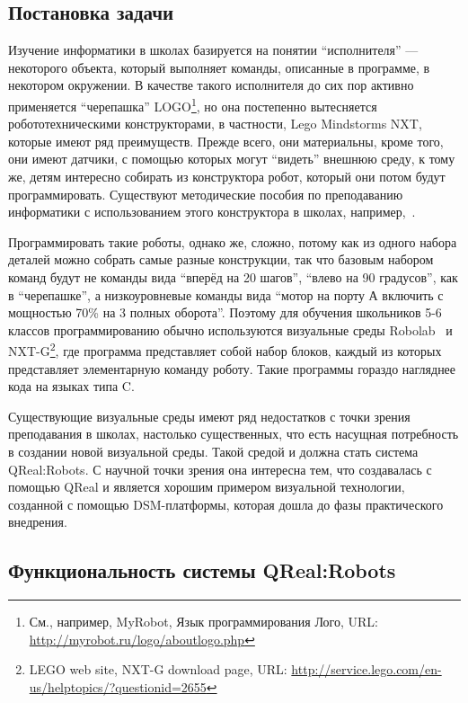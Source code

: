 \documentclass[a4]{article}
\begin{document}
\subsection{Постановка задачи}

Изучение информатики в школах базируется на понятии “исполнителя” --- некоторого объекта, который выполняет команды, описанные в программе, в некотором окружении. В качестве такого исполнителя до сих пор активно применяется ``черепашка'' LOGO\footnote{См., например, MyRobot, Язык программирования Лого, URL: \url{http://myrobot.ru/logo/aboutlogo.php}}, но она постепенно вытесняется робототехническими конструкторами, в частности, Lego Mindstorms NXT, которые имеют ряд преимуществ. Прежде всего, они материальны, кроме того, они имеют датчики, с помощью которых могут “видеть” внешнюю среду, к тому же, детям интересно собирать из конструктора робот, который они потом будут программировать. Существуют методические пособия по преподаванию информатики с использованием этого конструктора в школах, например,~\cite{lego}.

Программировать такие роботы, однако же, сложно, потому как из одного набора деталей можно собрать самые разные конструкции, так что базовым набором команд будут не команды вида ``вперёд на 20 шагов'', ``влево на 90 градусов'', как в ``черепашке'', а низкоуровневые команды вида ``мотор на порту А включить с мощностью 70\% на 3 полных оборота''. Поэтому для обучения школьников 5-6 классов программированию обычно используются визуальные среды Robolab~\cite{robolab} и NXT-G\footnote{LEGO web site, NXT-G download page, URL: \url{http://service.lego.com/en-us/helptopics/?questionid=2655}}, где программа представляет собой набор блоков, каждый из которых представляет элементарную команду роботу. Такие программы гораздо нагляднее кода на языках типа C.

Существующие визуальные среды имеют ряд недостатков с точки зрения преподавания в школах, настолько существенных, что есть насущная потребность в создании новой визуальной среды. Такой средой и должна стать система QReal:Robots. С научной точки зрения она интересна тем, что создавалась с помощью QReal и является хорошим примером визуальной технологии, созданной с помощью DSM-платформы, которая дошла до фазы практического внедрения.

\subsection{Функциональность системы QReal:Robots}
\end{document}
